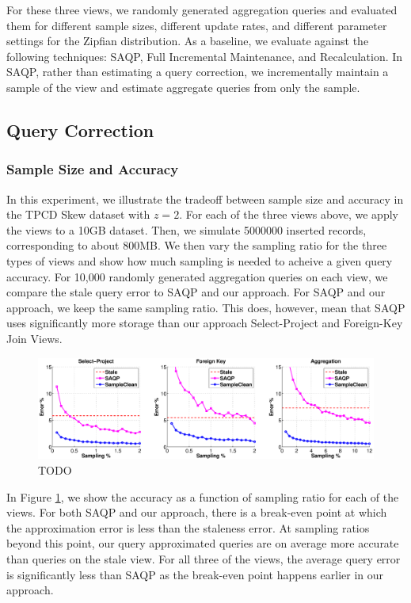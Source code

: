 \vspace{1em}

For these three views, we randomly generated aggregation queries and evaluated them for different sample sizes, different update rates, and different parameter settings for the Zipfian distribution.
As a baseline, we evaluate against the following techniques: SAQP, Full Incremental Maintenance, and Recalculation.
In SAQP, rather than estimating a query correction, we incrementally maintain a sample of the view and estimate aggregate queries from only the sample.

\subsection{Query Correction}

\subsubsection{Sample Size and Accuracy}
In this experiment, we illustrate the tradeoff between sample size and accuracy in the TPCD Skew dataset with $z = 2$.
For each of the three views above, we apply the views to a 10GB dataset.
Then, we simulate 5000000 inserted records, corresponding to about 800MB.
We then vary the sampling ratio for the three types of views and show how much sampling is needed to acheive a given query accuracy.
For 10,000 randomly generated aggregation queries on each view, we compare the stale query error to SAQP and our approach.
For SAQP and our approach, we keep the same sampling ratio.
This does, however, mean that SAQP uses significantly more storage than our approach Select-Project and Foreign-Key Join Views.

\begin{figure}[ht!]
\label{exp1sample}
\centering
 \includegraphics[width=\textwidth]{exp/exp1-samplesize-accuracy.eps}
 \caption{TODO}
\end{figure}

In Figure \ref{exp1sample}, we show the accuracy as a function of sampling ratio for each of the views.
For both SAQP and our approach, there is a break-even point at which the approximation error is less than the staleness error.
At sampling ratios beyond this point, our query approximated queries are on average more accurate than queries on the stale view.
For all three of the views, the average query error is significantly less than SAQP as the break-even point happens earlier in our approach.

